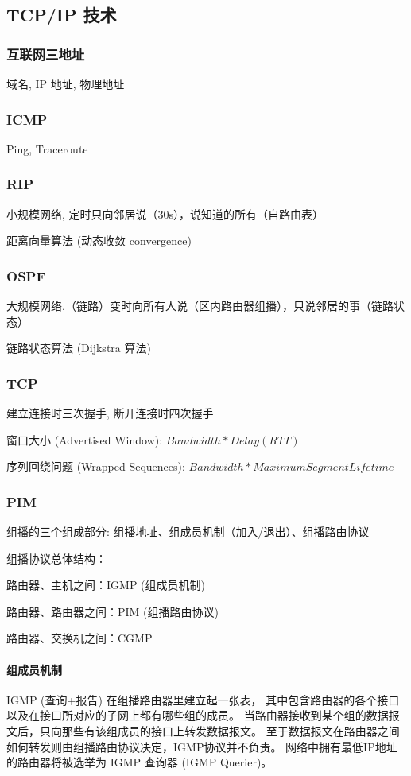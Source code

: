 \documentclass[UTF8,cs4size]{ctexart}
\begin{document}
\subsection{TCP/IP 技术}
\subsubsection{互联网三地址}
域名, IP 地址, 物理地址
\subsubsection{ICMP}
Ping, Traceroute
\subsubsection{RIP}
小规模网络, 定时只向邻居说（30s），说知道的所有（自路由表）

距离向量算法 (动态收敛 convergence)
\subsubsection{OSPF}
大规模网络,（链路）变时向所有人说（区内路由器组播），只说邻居的事（链路状态）

链路状态算法 (Dijkstra 算法)
\subsubsection{TCP}
建立连接时三次握手, 断开连接时四次握手

窗口大小 (Advertised Window): $Bandwidth * Delay(RTT)$

序列回绕问题 (Wrapped Sequences): $Bandwidth * MaximumSegmentLifetime$
\subsubsection{PIM}
组播的三个组成部分: 组播地址、组成员机制（加入/退出）、组播路由协议

组播协议总体结构：
\begin{compactitem}
  \item 路由器、主机之间：IGMP (组成员机制)
  \item 路由器、路由器之间：PIM (组播路由协议)
  \item 路由器、交换机之间：CGMP
\end{compactitem}

\paragraph{组成员机制}
IGMP (查询+报告) 在组播路由器里建立起一张表，
其中包含路由器的各个接口以及在接口所对应的子网上都有哪些组的成员。
当路由器接收到某个组的数据报文后，只向那些有该组成员的接口上转发数据报文。
至于数据报文在路由器之间如何转发则由组播路由协议决定，IGMP协议并不负责。
网络中拥有最低IP地址的路由器将被选举为 IGMP 查询器 (IGMP Querier)。
\end{document}
